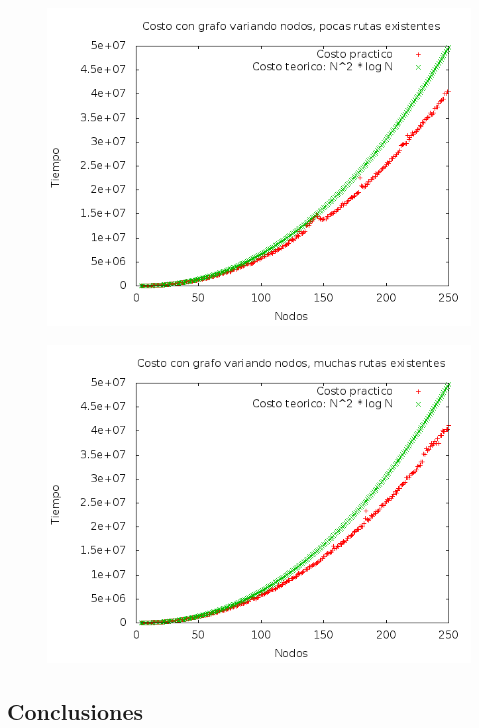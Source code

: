 \begin{figure}[H]
	\centering
	\includegraphics[scale=0.6]{ej2-grafico1.png}
\end{figure}


\begin{figure}[H]
	\centering
	\includegraphics[scale=0.6]{ej2-grafico2.png}
\end{figure}


\subsection{Conclusiones}

